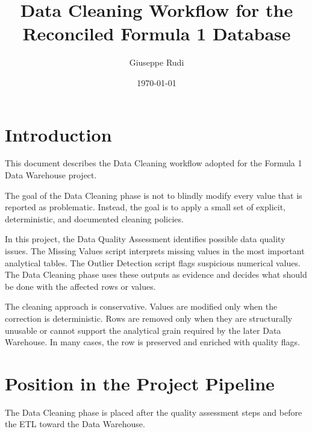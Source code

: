 \documentclass[a4paper,11pt]{article}
\title{Data Cleaning Workflow for the Reconciled Formula 1 Database}
\author{Giuseppe Rudi}
\date{\today}
\begin{document}
	
	\maketitle
	
	\section{Introduction}
	
	This document describes the Data Cleaning workflow adopted for the Formula 1 Data Warehouse project.
	
	The goal of the Data Cleaning phase is not to blindly modify every value that is reported as problematic.
	Instead, the goal is to apply a small set of explicit, deterministic, and documented cleaning policies.
	
	In this project, the Data Quality Assessment identifies possible data quality issues.
	The Missing Values script interprets missing values in the most important analytical tables.
	The Outlier Detection script flags suspicious numerical values.
	The Data Cleaning phase uses these outputs as evidence and decides what should be done with the affected rows or values.
	
	The cleaning approach is conservative.
	Values are modified only when the correction is deterministic.
	Rows are removed only when they are structurally unusable or cannot support the analytical grain required by the later Data Warehouse.
	In many cases, the row is preserved and enriched with quality flags.
	
	\section{Position in the Project Pipeline}
	
	The Data Cleaning phase is placed after the quality assessment steps and before the ETL toward the Data Warehouse.
	
\end{document}
